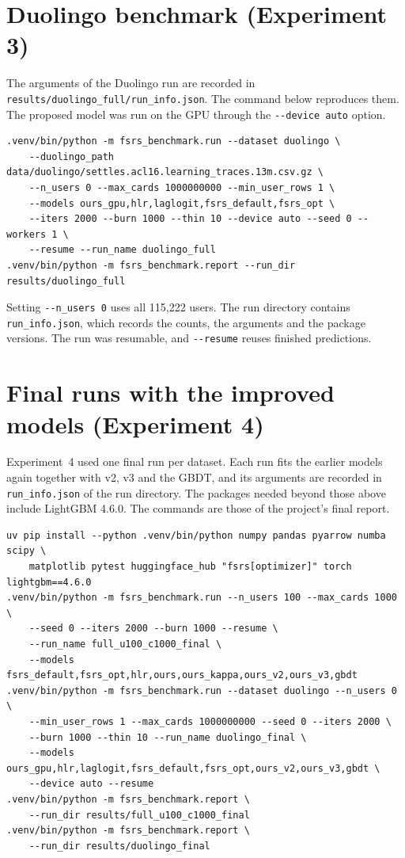 \section{Duolingo benchmark (Experiment 3)}

The arguments of the Duolingo run are recorded in \texttt{results/duolingo\_full/\allowbreak run\_info.json}. The command below
reproduces them. The proposed model was run on the GPU through the \texttt{-{}-device auto} option.

\begingroup\footnotesize\begin{verbatim}
.venv/bin/python -m fsrs_benchmark.run --dataset duolingo \
    --duolingo_path data/duolingo/settles.acl16.learning_traces.13m.csv.gz \
    --n_users 0 --max_cards 1000000000 --min_user_rows 1 \
    --models ours_gpu,hlr,laglogit,fsrs_default,fsrs_opt \
    --iters 2000 --burn 1000 --thin 10 --device auto --seed 0 --workers 1 \
    --resume --run_name duolingo_full
.venv/bin/python -m fsrs_benchmark.report --run_dir results/duolingo_full
\end{verbatim}
\endgroup

Setting \texttt{-{}-n\_users 0} uses all 115,222 users. The run directory contains \texttt{run\_info.json}, which records
the counts, the arguments and the package versions. The run was resumable, and \texttt{-{}-resume} reuses finished predictions.

\section{Final runs with the improved models (Experiment 4)}

Experiment~4 used one final run per dataset. Each run fits the earlier models again together with v2, v3 and the GBDT, and its
arguments are recorded in \texttt{run\_info.json} of the run directory. The packages needed beyond those above include
LightGBM 4.6.0. The commands are those of the project's final report.

\begingroup\footnotesize\begin{verbatim}
uv pip install --python .venv/bin/python numpy pandas pyarrow numba scipy \
    matplotlib pytest huggingface_hub "fsrs[optimizer]" torch lightgbm==4.6.0
.venv/bin/python -m fsrs_benchmark.run --n_users 100 --max_cards 1000 \
    --seed 0 --iters 2000 --burn 1000 --resume \
    --run_name full_u100_c1000_final \
    --models fsrs_default,fsrs_opt,hlr,ours,ours_kappa,ours_v2,ours_v3,gbdt
.venv/bin/python -m fsrs_benchmark.run --dataset duolingo --n_users 0 \
    --min_user_rows 1 --max_cards 1000000000 --seed 0 --iters 2000 \
    --burn 1000 --thin 10 --run_name duolingo_final \
    --models ours_gpu,hlr,laglogit,fsrs_default,fsrs_opt,ours_v2,ours_v3,gbdt \
    --device auto --resume
.venv/bin/python -m fsrs_benchmark.report \
    --run_dir results/full_u100_c1000_final
.venv/bin/python -m fsrs_benchmark.report \
    --run_dir results/duolingo_final
\end{verbatim}
\endgroup

